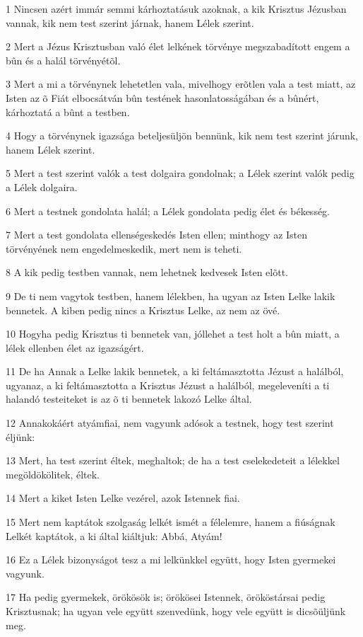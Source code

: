 \par 1 Nincsen azért immár semmi kárhoztatásuk azoknak, a kik Krisztus Jézusban vannak, kik nem test szerint járnak, hanem  Lélek szerint.
\par 2 Mert a Jézus Krisztusban való élet lelkének törvénye megszabadított engem a bûn és a halál törvényétõl.
\par 3 Mert a mi a törvénynek lehetetlen vala, mivelhogy erõtlen vala a test miatt, az Isten az õ Fiát elbocsátván bûn testének hasonlatosságában és a bûnért, kárhoztatá a bûnt a testben.
\par 4 Hogy a törvénynek igazsága beteljesüljön bennünk, kik nem test szerint járunk, hanem Lélek szerint.
\par 5 Mert a test szerint valók a test dolgaira gondolnak; a Lélek szerint valók pedig a Lélek dolgaira.
\par 6 Mert a testnek gondolata halál; a Lélek gondolata pedig élet és békesség.
\par 7 Mert a test gondolata ellenségeskedés Isten ellen; minthogy az Isten törvényének nem engedelmeskedik, mert nem is teheti.
\par 8 A kik pedig testben vannak, nem lehetnek kedvesek Isten elõtt.
\par 9 De ti nem vagytok testben, hanem lélekben, ha ugyan az Isten Lelke lakik bennetek. A kiben pedig nincs a Krisztus Lelke, az nem az övé.
\par 10 Hogyha pedig Krisztus ti bennetek van, jóllehet a test holt a bûn miatt, a lélek ellenben élet az igazságért.
\par 11 De ha Annak a Lelke lakik bennetek, a ki feltámasztotta Jézust a halálból, ugyanaz, a ki feltámasztotta a Krisztus Jézust a halálból, megeleveníti a ti halandó testeiteket  is az õ ti bennetek lakozó Lelke által.
\par 12 Annakokáért atyámfiai, nem vagyunk adósok a testnek, hogy test szerint éljünk:
\par 13 Mert, ha test szerint éltek, meghaltok; de ha a test cselekedeteit a lélekkel megöldökölitek, éltek.
\par 14 Mert a kiket Isten Lelke vezérel, azok Istennek fiai.
\par 15 Mert nem kaptátok szolgaság lelkét ismét a félelemre, hanem a fiúságnak Lelkét kaptátok, a ki  által kiáltjuk: Abbá, Atyám!
\par 16 Ez a Lélek bizonyságot tesz a mi lelkünkkel együtt, hogy Isten gyermekei vagyunk.
\par 17 Ha pedig gyermekek, örökösök is; örökösei Istennek, örököstársai pedig Krisztusnak; ha ugyan vele együtt szenvedünk,  hogy vele együtt is dicsõüljünk meg.
